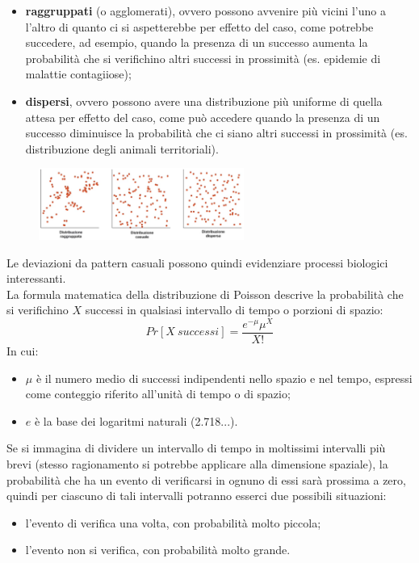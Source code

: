 \documentclass[10pt, draft]{book}
\newcommand{\tightlist}{%
\setlength{\itemsep}{1pt}\setlength{\parskip}{0pt}\setlength{\parsep}{0pt}}
\begin{document}
\begin{itemize} \tightlist
    \item \textbf{raggruppati} (o agglomerati), ovvero possono avvenire più vicini l'uno a l'altro di quanto ci si aspetterebbe per effetto del caso, come potrebbe succedere, ad esempio, quando la presenza di un successo aumenta la probabilità che si verifichino altri successi in prossimità (es. epidemie di malattie contagiiose);
    \item \textbf{dispersi}, ovvero possono avere una distribuzione più uniforme di quella attesa per effetto del caso, come può accedere quando la presenza di un successo diminuisce la probabilità che ci siano altri successi in prossimità (es. distribuzione degli animali territoriali).
\end{itemize}
    \begin{figure}[h]\label{fig8.6-1}
    \centering
    \includegraphics[width=0.6\textwidth]{fig8.6-1}
    \caption{\small{}}
    \end{figure}
Le deviazioni da pattern casuali possono quindi evidenziare processi biologici interessanti.
\\
La formula matematica della distribuzione di Poisson descrive la probabilità che si verifichino $X$ successi in qualsiasi intervallo di tempo o porzioni di spazio:
\begin{equation}
Pr[X\ successi] = \frac{e^{-\mu}\mu^X}{X!}
\end{equation}
In cui:
\begin{itemize} \tightlist
    \item \textbf{$\mu$} è il numero medio di successi indipendenti nello spazio e nel tempo, espressi come conteggio riferito all'unità di tempo o di spazio;
    \item \textbf{$e$} è la base dei logaritmi naturali (2.718...).
\end{itemize}
Se si immagina di dividere un intervallo di tempo in moltissimi intervalli più brevi (stesso ragionamento si potrebbe applicare alla dimensione spaziale), la probabilità che ha un evento di verificarsi in ognuno di essi sarà prossima a zero, quindi per ciascuno di tali intervalli potranno esserci due possibili situazioni:
\begin{itemize} \tightlist
    \item l'evento di verifica una volta, con probabilità molto piccola;
    \item l'evento non si verifica, con probabilità molto grande.
\end{itemize}
\end{document}
